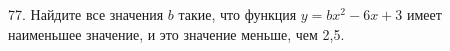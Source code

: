 77. Найдите все значения $b$ такие, что функция $y=bx^2-6x+3$ имеет наименьшее значение, и это значение меньше, чем 2,5.\\
